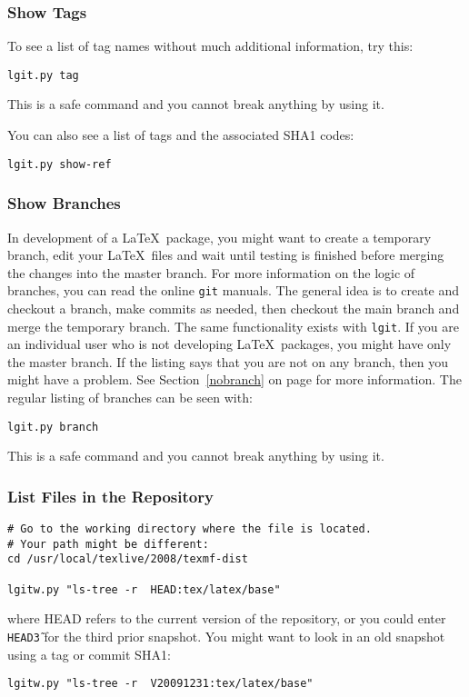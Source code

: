 \documentclass{ltxdoc}
\def\ucmd#1{{\tt {#1}}}
\begin{document}
\subsubsection{Show Tags}
To see a list of tag names without much additional information, try this:
\begin{verbatim}
lgit.py tag
\end{verbatim}
This is a safe command and you cannot break anything by using it.

You can also see a list of tags and the associated SHA1 codes:
\begin{verbatim}
lgit.py show-ref
\end{verbatim}
\subsubsection{Show Branches}
In development of a \LaTeX\ package, you might want to create a temporary branch, edit your \LaTeX\ files and wait until testing is finished before merging the changes into the master branch.  For more information on the logic of branches, you can read the online \ucmd{git} manuals.  The general idea is to create and checkout a branch, make commits as needed, then checkout the main branch and merge the temporary branch. The same functionality exists with \ucmd{lgit}.  If you are an individual user who is not developing \LaTeX\ packages, you might have only the master branch.  If the listing says that you are not on any branch, then you might have a problem.  See Section~\ref{nobranch} on page \pageref{nobranch} for more information.  The regular listing of branches can be seen with:
\begin{verbatim}
lgit.py branch
\end{verbatim}
This is a safe command and you cannot break anything by using it.

\subsubsection{List Files in the Repository}
\begin{verbatim}
# Go to the working directory where the file is located.
# Your path might be different:
cd /usr/local/texlive/2008/texmf-dist

lgitw.py "ls-tree -r  HEAD:tex/latex/base"
\end{verbatim}
where HEAD refers to the current version of the repository, or you could enter \ucmd{HEAD\~3} for the third prior snapshot. You might want to look in an old snapshot using a tag or commit SHA1:
\begin{verbatim}
lgitw.py "ls-tree -r  V20091231:tex/latex/base"
\end{verbatim}
\end{document}
